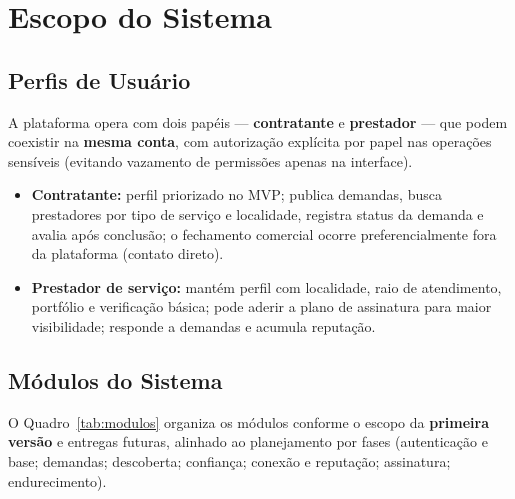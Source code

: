 \documentclass[12pt, a4paper]{article}
\begin{document}
\section{Escopo do Sistema}

\subsection{Perfis de Usuário}

A plataforma opera com dois papéis --- \textbf{contratante} e
\textbf{prestador} --- que podem coexistir na \textbf{mesma conta}, com
autorização explícita por papel nas operações sensíveis (evitando vazamento
de permissões apenas na interface).

\begin{itemize}
  \item \textbf{Contratante:} perfil priorizado no MVP; publica demandas,
        busca prestadores por tipo de serviço e localidade, registra
        status da demanda e avalia após conclusão; o fechamento comercial
        ocorre preferencialmente fora da plataforma (contato direto).
  \item \textbf{Prestador de serviço:} mantém perfil com localidade,
        raio de atendimento, portfólio e verificação básica; pode aderir a
        plano de assinatura para maior visibilidade; responde a demandas e
        acumula reputação.
\end{itemize}

\subsection{Módulos do Sistema}

O Quadro~\ref{tab:modulos} organiza os módulos conforme o escopo da
\textbf{primeira versão} e entregas futuras, alinhado ao planejamento por
fases (autenticação e base; demandas; descoberta; confiança; conexão e
reputação; assinatura; endurecimento).
\end{document}
